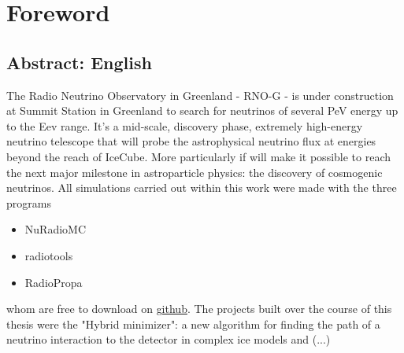 \documentclass[11pt,a4paper,faculty=we,language=en,doctype=report]{cls/ugent-doc}
\renewcommand{\ULthickness}{2pt} %
\begin{document}

\maketitle
\renewcommand{\ULthickness}{1pt}


{\hypersetup{hidelinks}\tableofcontents} %
\newpage


\chapter{Foreword}
\section{Abstract: English}
The Radio Neutrino Observatory in Greenland - RNO-G - is under construction at Summit Station in Greenland to search for neutrinos of several PeV energy up to the Eev range. It's a mid-scale, discovery phase, extremely high-energy neutrino telescope that will probe the astrophysical neutrino flux at energies beyond the reach of IceCube.
More particularly if will make it possible to reach the next major milestone in astroparticle physics: the discovery of cosmogenic neutrinos.
\vspace{0.5cm}
All simulations carried out within this work were made with the three programs 
\begin{itemize}
	\item NuRadioMC
	\item radiotools
	\item RadioPropa
\end{itemize}
whom are free to download on \href{https://github.com/nu-radio}{github}.
The projects built over the course of this thesis were the "Hybrid minimizer": a new
algorithm for finding the path of a neutrino interaction to the detector in complex ice models
and (...)
\end{document}
